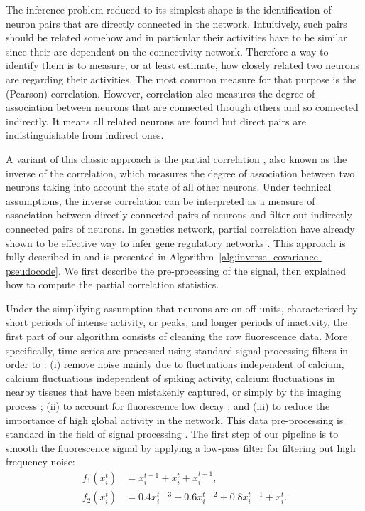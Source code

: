 \documentclass[wcp]{jmlr}
\begin{document}
The inference problem reduced to its simplest shape is the identification of
neuron pairs that are directly connected in the network. Intuitively, such
pairs should be related somehow and in particular their activities have to be
similar since their are dependent on the connectivity network. Therefore a way
to identify them is to measure, or at least estimate, how closely related two
neurons are regarding their activities. The most common measure for that
purpose is the (Pearson) correlation.  However, correlation also measures the
degree of association between neurons that are connected through others and so
connected indirectly. It means all related neurons are found but direct pairs
are indistinguishable from indirect ones.

A variant of this classic approach is the partial correlation
\citep{sutera2014simple}, also known as the inverse of the correlation, which
measures the degree of association between two neurons taking into account the
state of all other neurons. Under technical assumptions, the inverse
correlation can be interpreted as a measure of association between directly
connected pairs of neurons and filter out indirectly connected pairs of
neurons. In genetics network, partial correlation have already shown to be
effective way to infer gene regulatory networks
\citep{de2004discovery,Schafer:2005}. This approach is fully described in
\cite{sutera2014simple} and is presented in Algorithm~\ref{alg:inverse-
covariance- pseudocode}. We first describe the pre-processing of the signal,
then explained how to compute the partial  correlation statistics.


Under the simplifying assumption that neurons are on-off units, characterised
by short periods of intense activity, or peaks, and longer periods of
inactivity, the first part of our algorithm consists of cleaning the raw
fluorescence data. More specifically, time-series are processed using standard
signal processing filters in order to : (i) remove noise mainly due to
fluctuations independent of calcium, calcium fluctuations independent of
spiking activity, calcium fluctuations in nearby tissues that have been
mistakenly captured, or simply by the imaging process ; (ii) to account for
fluorescence low decay ; and (iii) to reduce the importance of high global
activity in the network. This data pre-processing is standard  in the field of
signal processing \citep{kaiser1977data, oppenheim1983signals}.
The first step of our pipeline is to smooth the fluorescence signal by applying a low-pass filter for filtering out high frequency noise:
\begin{align}
f_1(x^t_i) &= x^{t-1}_i + x^t_i + x^{t+1}_i, \label{eq:symetric-median} \\
f_2(x^t_i) &= 0.4 x^{t-3}_i + 0.6 x^{t-2}_i + 0.8 x^{t-1}_i + x_i^t.
\label{eq:weighted-asymetric-median}
\end{align}
\end{document}
